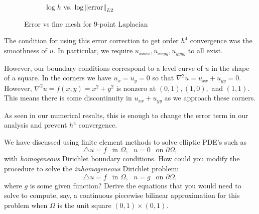 \documentclass[10pt]{article}
\begin{document}
\begin{solution}[Solution]
\begin{figure}[H]
\begin{subfigure}{.48\textwidth}
        \caption{\(\log h\) vs. \( \log\left\lVert\text{error}\right\rVert_{L2} \)}
    \end{subfigure}
\caption{Error vs fine mesh for 9-point Laplacian}
\label{9pt}
\end{figure}


The condition for using this error correction to get order \( h^4 \) convergence was the smoothness of \( u \). In particular, we require \( u_{xxxx},u_{xxyy},u_{yyyy} \) to all exist. 

However, our boundary conditions correspond to a level curve of \( u \) in the shape of a square. In the corners we have \( u_x = u_y = 0 \) so that \( \nabla^2 u = u_{xx}+u_{yy} = 0 \). However, \( \nabla^2 u = f(x,y) = x^2+y^2 \) is nonzero at \( (0,1), (1,0), \) and \( (1,1) \). This means there is some discontinuity in \( u_{xx}+u_{yy} \) as we approach these corners. 

As seen in our numerical results, this is enough to change the error term in our analysis and prevent \( h^4 \) convergence.



\end{solution}

\begin{problem}[Problem 3] 
We have discussed using finite element methods to solve elliptic PDE's such as 
\[
\bigtriangleup u = f~~\mbox{ in } \Omega ,~~~u = 0~~\mbox{ on } \partial \Omega ,
\]
with {\em homogeneous} Dirichlet boundary conditions.  How could you modify the procedure
to solve the {\em inhomogeneous} Dirichlet problem:
\[
\bigtriangleup u = f~~\mbox{ in } \Omega ,~~~u = g~~\mbox{ on } \partial \Omega ,
\]
where \( g \) is some given function?  Derive the equations that you would need to
solve to compute, say, a continuous piecewise bilinear approximation for this problem
when \( \Omega \) is the unit square \( (0,1) \times (0,1) \).
\end{problem}
\end{document}
